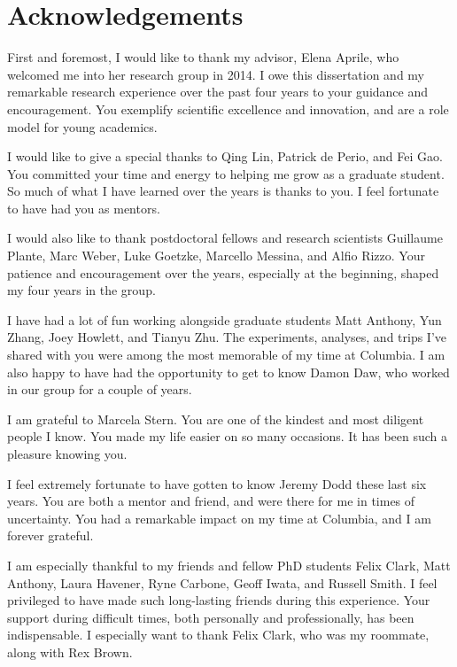 
\cleartorecto %
\chapter{Acknowledgements} %
\thispagestyle{plain} %

First and foremost, I would like to thank my advisor, Elena Aprile, who welcomed me into her research group in 2014.  I owe this dissertation and my
remarkable research experience over the past four years to your guidance and encouragement.  You exemplify scientific excellence and
innovation, and are a role model for young academics.

I would like to give a special thanks to Qing Lin, Patrick de Perio, and Fei Gao.  You committed your time and energy to helping me grow
as a graduate student.  So much of what I have learned over the years is thanks to you.  I feel fortunate to have had you as mentors.

I would also like to thank postdoctoral fellows and research scientists Guillaume Plante, Marc Weber, Luke Goetzke, Marcello Messina, and
Alfio Rizzo.  Your patience and encouragement over the years, especially at the beginning, shaped my four years in the group.

I have had a lot of fun working alongside graduate students Matt Anthony, Yun Zhang, Joey Howlett, and Tianyu Zhu.  The experiments,
analyses, and trips I've shared with you were among the most memorable of my time at Columbia.  I am also happy to have had the
opportunity to get to know Damon Daw, who worked in our group for a couple of years.

I am grateful to Marcela Stern.  You are one of the kindest and most diligent people I know.  You made my life easier on so many
occasions.  It has been such a pleasure knowing you.

I feel extremely fortunate to have gotten to know Jeremy Dodd these last six years.  You are both
a mentor and friend, and were there for me in times of uncertainty.  You had a remarkable impact on my time
at Columbia, and I am forever grateful.

I am especially thankful to my friends and fellow PhD students Felix Clark, Matt Anthony, Laura Havener, Ryne Carbone, Geoff Iwata, and
Russell Smith.  I feel privileged to have made such long-lasting friends during this experience.  Your support during difficult times,
both personally and professionally,
has been indispensable.  I especially want to thank Felix Clark, who was my roommate, along with Rex Brown.


